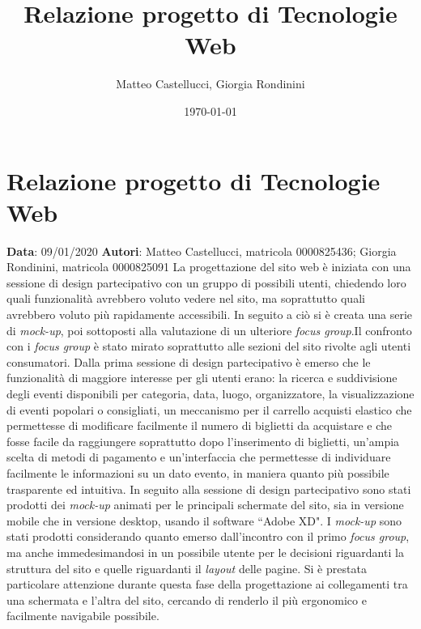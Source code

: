 \documentclass[a4paper, 12pt]{report}
\title{Relazione progetto di Tecnologie Web}
\author{Matteo Castellucci, Giorgia Rondinini}
\date{\today}
\begin{document}
	
\section*{Relazione progetto di Tecnologie Web}

\textbf{Data}: 09/01/2020\newline
\textbf{Autori}: Matteo Castellucci, matricola 0000825436; Giorgia Rondinini, matricola 0000825091\newline
\newline
La progettazione del sito web è iniziata con una sessione di design partecipativo con un gruppo di possibili utenti, chiedendo loro quali funzionalità avrebbero voluto vedere nel sito, ma soprattutto quali avrebbero voluto più rapidamente accessibili. In seguito a ciò si è creata una serie di \textit{mock-up}, poi sottoposti alla valutazione di un ulteriore \textit{focus group}.\newline Il confronto con i \textit{focus group} è stato mirato soprattutto alle sezioni del sito rivolte agli utenti consumatori.\newline\newline
Dalla prima sessione di design partecipativo è emerso che le funzionalità di maggiore interesse per gli utenti erano: la ricerca e suddivisione degli eventi disponibili per categoria, data, luogo, organizzatore, la visualizzazione di eventi popolari o consigliati, un meccanismo per il carrello acquisti elastico che permettesse di modificare facilmente il numero di biglietti da acquistare e che fosse facile da raggiungere soprattutto dopo l'inserimento di biglietti, un’ampia scelta di metodi di pagamento e un’interfaccia che permettesse di individuare facilmente le informazioni su un dato evento, in maniera quanto più possibile trasparente ed intuitiva.\newline
In seguito alla sessione di design partecipativo sono stati prodotti dei \textit{mock-up} animati per le principali schermate del sito, sia in versione mobile che in versione desktop, usando il software ``Adobe XD".\newline
I \textit{mock-up} sono stati prodotti considerando quanto emerso dall'incontro con il primo \textit{focus group}, ma anche immedesimandosi in un possibile utente per le decisioni riguardanti la struttura del sito e quelle riguardanti il \textit{layout} delle pagine. Si è prestata particolare attenzione durante questa fase della progettazione ai collegamenti tra una schermata e l’altra del sito, cercando di renderlo il più ergonomico e facilmente navigabile possibile.\newline
\end{document}
